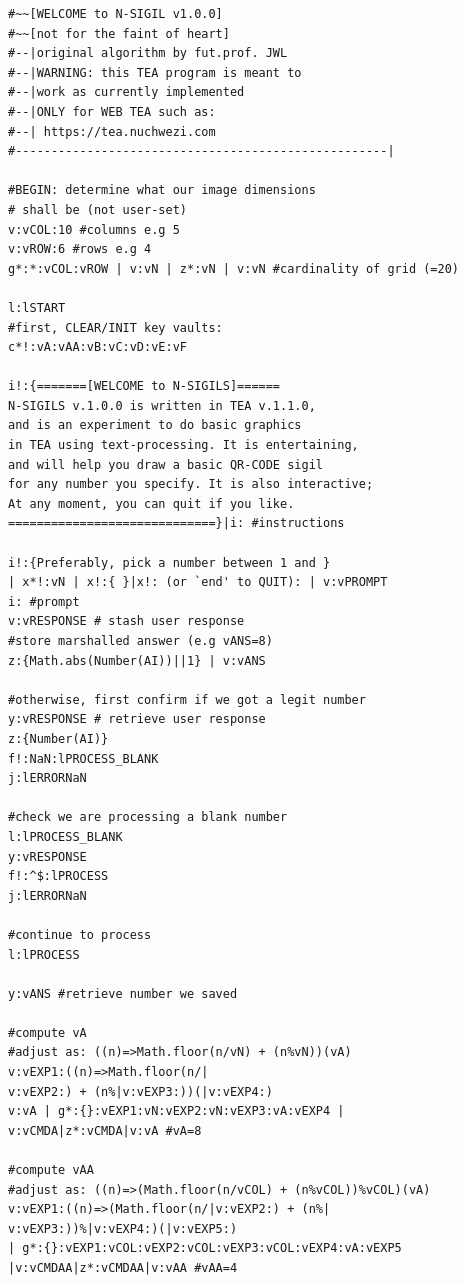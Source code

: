 \documentclass[a4paper, 18pt]{book} %
\begin{document}
 \small
  \centering
  \begin{tcolorbox}[teaterminalstyle, title=TEA Program: N-SIGIL image generator program, breakable]
  \begin{lstlisting}[language=TEA,breaklines=true]
#~~[WELCOME to N-SIGIL v1.0.0]
#~~[not for the faint of heart]
#--|original algorithm by fut.prof. JWL
#--|WARNING: this TEA program is meant to 
#--|work as currently implemented
#--|ONLY for WEB TEA such as: 
#--| https://tea.nuchwezi.com
#----------------------------------------------------|

#BEGIN: determine what our image dimensions 
# shall be (not user-set)
v:vCOL:10 #columns e.g 5
v:vROW:6 #rows e.g 4
g*:*:vCOL:vROW | v:vN | z*:vN | v:vN #cardinality of grid (=20)

l:lSTART
#first, CLEAR/INIT key vaults:
c*!:vA:vAA:vB:vC:vD:vE:vF

i!:{=======[WELCOME to N-SIGILS]======
N-SIGILS v.1.0.0 is written in TEA v.1.1.0, 
and is an experiment to do basic graphics 
in TEA using text-processing. It is entertaining,
and will help you draw a basic QR-CODE sigil
for any number you specify. It is also interactive;
At any moment, you can quit if you like.
=============================}|i: #instructions

i!:{Preferably, pick a number between 1 and } 
| x*!:vN | x!:{ }|x!: (or `end' to QUIT): | v:vPROMPT
i: #prompt
v:vRESPONSE # stash user response
#store marshalled answer (e.g vANS=8)
z:{Math.abs(Number(AI))||1} | v:vANS 

#otherwise, first confirm if we got a legit number
y:vRESPONSE # retrieve user response
z:{Number(AI)} 
f!:NaN:lPROCESS_BLANK
j:lERRORNaN 

#check we are processing a blank number
l:lPROCESS_BLANK
y:vRESPONSE
f!:^$:lPROCESS
j:lERRORNaN

#continue to process
l:lPROCESS

y:vANS #retrieve number we saved

#compute vA
#adjust as: ((n)=>Math.floor(n/vN) + (n%vN))(vA)
v:vEXP1:((n)=>Math.floor(n/|
v:vEXP2:) + (n%|v:vEXP3:))(|v:vEXP4:)
v:vA | g*:{}:vEXP1:vN:vEXP2:vN:vEXP3:vA:vEXP4 |
v:vCMDA|z*:vCMDA|v:vA #vA=8

#compute vAA
#adjust as: ((n)=>(Math.floor(n/vCOL) + (n%vCOL))%vCOL)(vA)
v:vEXP1:((n)=>(Math.floor(n/|v:vEXP2:) + (n%|
v:vEXP3:))%|v:vEXP4:)(|v:vEXP5:)
| g*:{}:vEXP1:vCOL:vEXP2:vCOL:vEXP3:vCOL:vEXP4:vA:vEXP5 
|v:vCMDAA|z*:vCMDAA|v:vAA #vAA=4
 

\end{lstlisting}
\end{tcolorbox}
\end{document}
